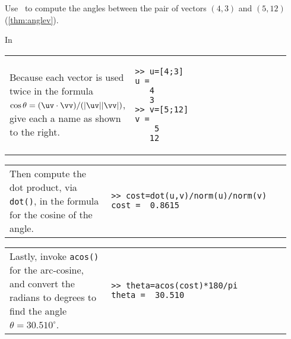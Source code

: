 \begin{example} 
Use \script\ to compute the angles between the pair of vectors \((4,3)\) and \((5,12)\) (\cref{thm:anglev}).
\begin{solution} In \script

\begin{tabular}{@{}p{0.34\linewidth}p{0.6\linewidth}@{}}\raggedright
Because each vector is used twice in the formula \(\cos\theta=(\uv\cdot\vv)/(|\uv||\vv|)\), give each a name as shown to the right.
&\begin{verbatim}
>> u=[4;3]
u =
   4
   3
>> v=[5;12]
v =
    5
   12
\end{verbatim}
\end{tabular}
\setbox\ajrqrbox\hbox{}%
\marginajrbox%

\begin{tabular}{@{}p{0.34\linewidth}p{0.6\linewidth}@{}}\raggedright
Then compute the dot product, via \verb|dot()|, in the formula for the cosine of the angle.
&\begin{verbatim}
>> cost=dot(u,v)/norm(u)/norm(v)
cost =  0.8615
\end{verbatim}
\end{tabular}

\begin{tabular}{@{}p{0.34\linewidth}p{0.6\linewidth}@{}}\raggedright
Lastly, invoke \verb|acos()| for the arc-cosine, and convert the radians to degrees to find the angle \(\theta=30.510^\circ\).
&\begin{verbatim}
>> theta=acos(cost)*180/pi
theta =  30.510
\end{verbatim}
\end{tabular}

\end{solution}
\end{example}




